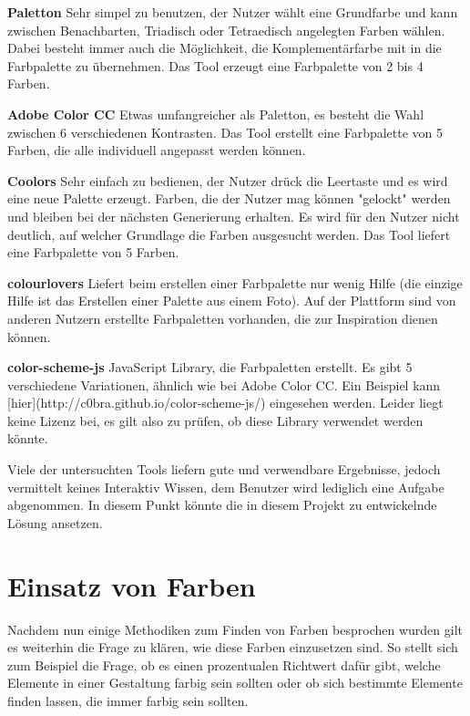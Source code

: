 \textbf{Paletton}
Sehr simpel zu benutzen, der Nutzer wählt eine Grundfarbe und kann zwischen Benachbarten, Triadisch oder Tetraedisch angelegten Farben wählen. Dabei besteht immer auch die Möglichkeit, die Komplementärfarbe mit in die Farbpalette zu übernehmen. Das Tool erzeugt eine Farbpalette von 2 bis 4 Farben.

\textbf{Adobe Color CC}
Etwas umfangreicher als Paletton, es besteht die Wahl zwischen 6 verschiedenen Kontrasten. Das Tool erstellt eine Farbpalette von 5 Farben, die alle individuell angepasst werden können.

\textbf{Coolors}
Sehr einfach zu bedienen, der Nutzer drück die Leertaste und es wird eine neue Palette erzeugt. Farben, die der Nutzer mag können "gelockt" werden und bleiben bei der nächsten Generierung erhalten. Es wird für den Nutzer nicht deutlich, auf welcher Grundlage die Farben ausgesucht werden. Das Tool liefert eine Farbpalette von 5 Farben.

\textbf{colourlovers}
Liefert beim erstellen einer Farbpalette nur wenig Hilfe (die einzige Hilfe ist das Erstellen einer Palette aus einem Foto). Auf der Plattform sind von anderen Nutzern erstellte Farbpaletten vorhanden, die zur Inspiration dienen können.

\textbf{color-scheme-js}
JavaScript Library, die Farbpaletten erstellt. Es gibt 5 verschiedene Variationen, ähnlich wie bei Adobe Color CC. Ein Beispiel kann [hier](http://c0bra.github.io/color-scheme-js/) eingesehen werden. Leider liegt keine Lizenz bei, es gilt also zu prüfen, ob diese Library verwendet werden könnte.

Viele der untersuchten Tools liefern gute und verwendbare Ergebnisse, jedoch vermittelt keines Interaktiv Wissen, dem Benutzer wird lediglich eine Aufgabe abgenommen. In diesem Punkt könnte die in diesem Projekt zu entwickelnde Lösung ansetzen.


\section{Einsatz von Farben}

Nachdem nun einige Methodiken zum Finden von Farben besprochen wurden gilt es weiterhin die Frage zu klären, wie diese Farben einzusetzen sind. So stellt sich zum Beispiel die Frage, ob es einen prozentualen Richtwert dafür gibt, welche Elemente in einer Gestaltung farbig sein sollten oder ob sich bestimmte Elemente finden lassen, die immer farbig sein sollten.

